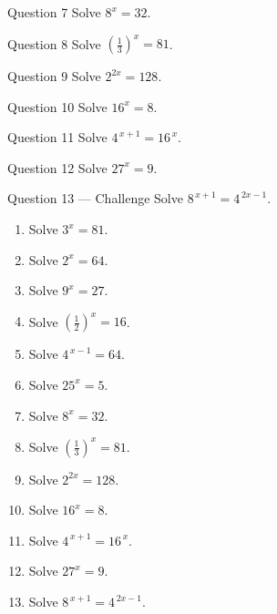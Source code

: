 \documentclass[11pt]{article}
\begin{document}
\begin{qbox}{Question 7}
Solve $8^{x}=32$.\workspace{2.4cm}
\end{qbox}

\begin{qbox}{Question 8}
Solve $\left(\tfrac13\right)^{x}=81$.\workspace{2.4cm}
\end{qbox}

\begin{qbox}{Question 9}
Solve $2^{2x}=128$.\workspace{2.4cm}
\end{qbox}

\begin{qbox}{Question 10}
Solve $16^{x}=8$.\workspace{2.4cm}
\end{qbox}

\begin{qbox}{Question 11}
Solve $4^{\,x+1}=16^{\,x}$.\workspace{2.4cm}
\end{qbox}

\begin{qbox}{Question 12}
Solve $27^{x}=9$.\workspace{2.4cm}
\end{qbox}

\begin{qbox}{Question 13 --- Challenge}
Solve $8^{\,x+1}=4^{\,2x-1}$.\workspace{3cm}
\end{qbox}

\clearpage
{}

\begin{recapbox}
\begin{multicols}{2}
\small
\begin{enumerate}[leftmargin=*,itemsep=3pt]
  \item Solve $3^{x}=81$.
  \item Solve $2^{x}=64$.
  \item Solve $9^{x}=27$.
  \item Solve $\left(\tfrac12\right)^{x}=16$.
  \item Solve $4^{\,x-1}=64$.
  \item Solve $25^{x}=5$.
  \item Solve $8^{x}=32$.
  \item Solve $\left(\tfrac13\right)^{x}=81$.
  \item Solve $2^{2x}=128$.
  \item Solve $16^{x}=8$.
  \item Solve $4^{\,x+1}=16^{\,x}$.
  \item Solve $27^{x}=9$.
  \item Solve $8^{\,x+1}=4^{\,2x-1}$.
\end{enumerate}
\end{multicols}
\end{recapbox}
\end{document}
